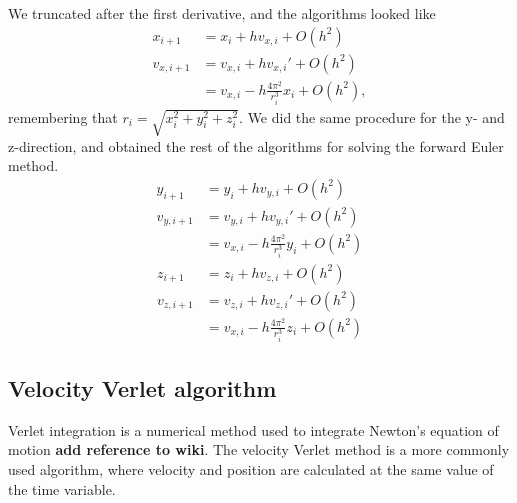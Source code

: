 \documentclass[12pt]{article}
\begin{document}
\noindent We truncated after the first derivative, and the algorithms looked like
\begin{equation} \label{euler_x}
\begin{split}
x_{i+1} &= x_i + hv_{x,i} + O(h^2)\\
v_{x, i+1} &= v_{x,i} + hv_{x,i}' + O(h^2)\\ 
&= v_{x,i} - h\frac{4 \pi^2}{r_i^3}x_i + O(h^2),
\end{split}
\end{equation}
\noindent remembering that $r_i = \sqrt{x_i^2 + y_i^2 + z_i^2}$. We did the same procedure for the y- and z-direction, and obtained the rest of the algorithms for solving the forward Euler method.
\begin{equation} \label{euler_y}
\begin{split}
y_{i+1} &= y_i + hv_{y,i} + O(h^2)\\
v_{y, i+1} &= v_{y,i} + hv_{y,i}' + O(h^2)\\ 
&= v_{x,i} - h\frac{4 \pi^2}{r_i^3}y_i + O(h^2)
\end{split}
\end{equation}
\begin{equation} \label{euler_z}
\begin{split}
z_{i+1} &= z_i + hv_{z,i} + O(h^2)\\
v_{z, i+1} &= v_{z,i} + hv_{z,i}' + O(h^2)\\
&= v_{x,i} - h\frac{4 \pi^2}{r_i^3}z_i + O(h^2)
\end{split}
\end{equation}

\subsection{Velocity Verlet algorithm}

\noindent Verlet integration is a numerical method used to integrate Newton's equation of motion \textbf{add reference to wiki}. The velocity Verlet method is a more commonly used algorithm, where velocity and position are calculated at the same value of the time variable. \\
\end{document}
